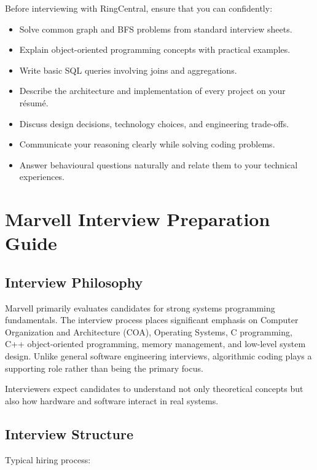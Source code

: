 \documentclass[11pt,a4paper]{article}
\begin{document}
Before interviewing with RingCentral, ensure that you can confidently:

\begin{itemize}
	\item Solve common graph and BFS problems from standard interview sheets.
	\item Explain object-oriented programming concepts with practical examples.
	\item Write basic SQL queries involving joins and aggregations.
	\item Describe the architecture and implementation of every project on your résumé.
	\item Discuss design decisions, technology choices, and engineering trade-offs.
	\item Communicate your reasoning clearly while solving coding problems.
	\item Answer behavioural questions naturally and relate them to your technical experiences.
\end{itemize}

\section{Marvell Interview Preparation Guide}

\subsection{Interview Philosophy}

Marvell primarily evaluates candidates for strong systems programming fundamentals. The interview process places significant emphasis on Computer Organization and Architecture (COA), Operating Systems, C programming, C++ object-oriented programming, memory management, and low-level system design. Unlike general software engineering interviews, algorithmic coding plays a supporting role rather than being the primary focus.

Interviewers expect candidates to understand not only theoretical concepts but also how hardware and software interact in real systems.


\subsection{Interview Structure}

Typical hiring process:
\end{document}
